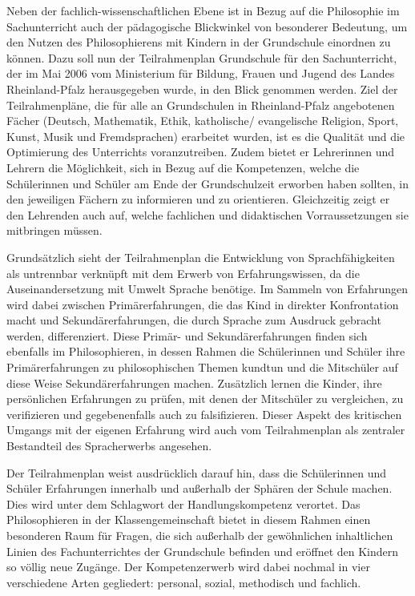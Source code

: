 Neben der fachlich-wissenschaftlichen Ebene ist in Bezug auf die Philosophie im Sachunterricht auch der pädagogische Blickwinkel von besonderer Bedeutung, um den Nutzen des Philosophierens mit Kindern in der Grundschule einordnen zu können. 
Dazu soll nun der Teilrahmenplan Grundschule für den Sachunterricht, der im Mai 2006 vom Ministerium für Bildung, Frauen und Jugend des Landes Rheinland-Pfalz herausgegeben wurde, in den Blick genommen werden. 
Ziel der Teilrahmenpläne, die für alle an Grundschulen in Rheinland-Pfalz angebotenen Fächer (Deutsch, Mathematik, Ethik, katholische/ evangelische Religion, Sport, Kunst, Musik und Fremdsprachen) erarbeitet wurden, ist es die Qualität und die Optimierung des Unterrichts voranzutreiben. 
Zudem bietet er Lehrerinnen und Lehrern die Möglichkeit, sich in Bezug auf die Kompetenzen, welche die Schülerinnen und Schüler am Ende der Grundschulzeit erworben haben sollten, in den jeweiligen Fächern zu informieren und zu orientieren. 
Gleichzeitig zeigt er den Lehrenden auch auf, welche fachlichen und didaktischen Vorraussetzungen sie mitbringen müssen.

Grundsätzlich sieht der Teilrahmenplan die Entwicklung von Sprachfähigkeiten als untrennbar verknüpft mit dem Erwerb von Erfahrungswissen, da die Auseinandersetzung mit Umwelt Sprache benötige\cite[S.\,6]{MBFJ06}.
Im Sammeln von Erfahrungen wird dabei zwischen Primärerfahrungen, die das Kind in direkter Konfrontation macht und Sekundärerfahrungen, die durch Sprache zum Ausdruck gebracht werden, differenziert. 
Diese Primär- und Sekundärerfahrungen finden sich ebenfalls im Philosophieren, in dessen Rahmen die Schülerinnen und Schüler ihre Primärerfahrungen zu philosophischen Themen kundtun und die Mitschüler auf diese Weise Sekundärerfahrungen machen. 
Zusätzlich lernen die Kinder, ihre persönlichen Erfahrungen zu prüfen, mit denen der Mitschüler zu vergleichen, zu verifizieren und gegebenenfalls auch zu falsifizieren. 
Dieser Aspekt des kritischen Umgangs mit der eigenen Erfahrung wird auch vom Teilrahmenplan als zentraler Bestandteil des Spracherwerbs angesehen.

Der Teilrahmenplan weist ausdrücklich darauf hin, dass die Schülerinnen und Schüler Erfahrungen innerhalb und außerhalb der Sphären der Schule machen. 
Dies wird unter dem Schlagwort der \glqq Handlungskompetenz\grqq{} verortet. 
Das Philosophieren in der Klassengemeinschaft bietet in diesem Rahmen einen besonderen Raum für Fragen, die sich außerhalb der gewöhnlichen inhaltlichen Linien des Fachunterrichtes der Grundschule befinden und eröffnet den Kindern so völlig neue Zugänge. 
Der Kompetenzerwerb wird dabei nochmal in vier verschiedene Arten gegliedert: personal, sozial, methodisch und fachlich. 

